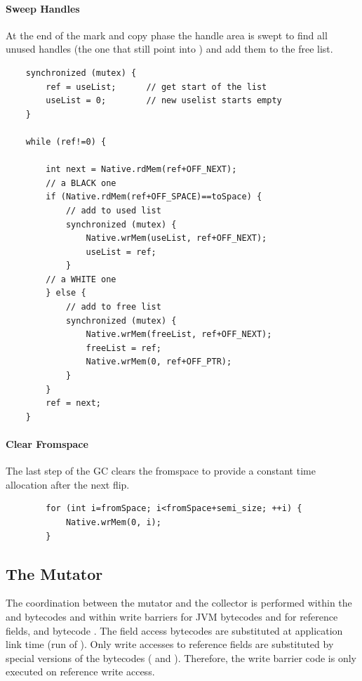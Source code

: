 \paragraph{Sweep Handles} At the end of the mark and copy phase the
handle area is swept to find all unused handles (the one that still
point into ) and add them to the free list.
%
\begin{lstlisting}
    synchronized (mutex) {
        ref = useList;      // get start of the list
        useList = 0;        // new uselist starts empty
    }

    while (ref!=0) {

        int next = Native.rdMem(ref+OFF_NEXT);
        // a BLACK one
        if (Native.rdMem(ref+OFF_SPACE)==toSpace) {
            // add to used list
            synchronized (mutex) {
                Native.wrMem(useList, ref+OFF_NEXT);
                useList = ref;
            }
        // a WHITE one
        } else {
            // add to free list
            synchronized (mutex) {
                Native.wrMem(freeList, ref+OFF_NEXT);
                freeList = ref;
                Native.wrMem(0, ref+OFF_PTR);
            }
        }
        ref = next;
    }
\end{lstlisting}

\paragraph{Clear Fromspace} The last step of the GC clears the
fromspace to provide a constant time allocation after the next flip.
%
\begin{lstlisting}
        for (int i=fromSpace; i<fromSpace+semi_size; ++i) {
            Native.wrMem(0, i);
        }
\end{lstlisting}

\subsection{The Mutator}

The coordination between the mutator and the collector is performed
within the  and  bytecodes and within write
barriers for JVM bytecodes  and  for
reference fields, and bytecode . The field access
bytecodes are substituted at application link time (run of
). Only write accesses to reference fields are
substituted by special versions of the bytecodes
( and ). Therefore, the
write barrier code is only executed on reference write access.

